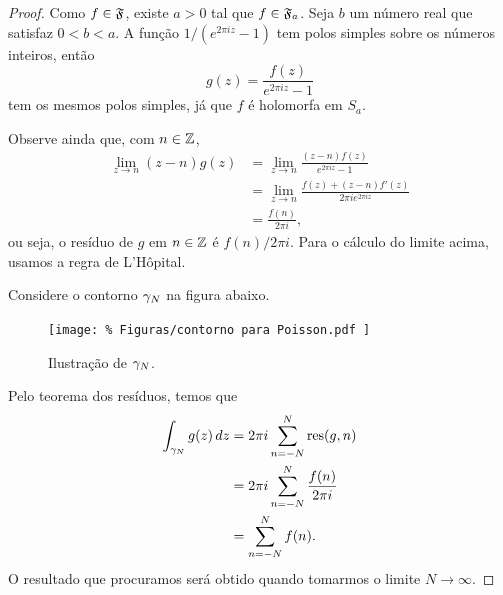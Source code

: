         \begin{proof}
            Como $f\in\mathfrak{F}$, existe $a > 0$ tal que $f\in\mathfrak{F}_a$. Seja 
            $b$ um número real que satisfaz $0<b<a$. A função $1/(e^{2\pi i z} - 1)$ 
            tem polos simples sobre os números inteiros, então
            \begin{equation*}
                g(z) = \frac{f(z)}{e^{2\pi i z} - 1}
            \end{equation*}
            tem os mesmos polos simples, já que $f$ é holomorfa em $S_a$. 
            
            Observe ainda que, com $n \in \mathbb{Z}$,
            \begin{align*}
                \lim_{z \to n} (z-n)g(z) & = 
                \lim_{z \to n} \frac{(z-n)f(z)}{e^{2\pi i z} - 1}\\
                &= \lim_{z \to n} \frac{f(z) + (z-n)f'(z)}{2\pi ie^{2\pi i z}} \\
                &= \frac{f(n)}{2\pi i},
            \end{align*}
            ou seja, o resíduo de $g$ em $n \in \mathbb{Z}$ é $f(n)/2\pi i$. Para o cálculo do limite acima,
            usamos a regra de L'Hôpital.
            
            Considere o contorno $\gamma_N$ na figura abaixo. 
            \begin{figure}[H]\centering
                \texttt{[image: \%
                    Figuras/contorno para Poisson.pdf
                ]}
                \caption{%
                    Ilustração de $\gamma_N$.
                }
            \end{figure}
            Pelo teorema dos resíduos, temos que 
            \begin{align*}
                \int_{\gamma_N}g(z)\,dz &= 2\pi i\sum_{n=-N}^{N}\operatorname{res}(g,n)\\
                &= 2 \pi i\sum_{n=-N}^{N}\frac{f(n)}{2 \pi i}\\
                &= \sum_{n=-N}^{N}f(n).
            \end{align*}
            O resultado que procuramos será obtido quando tomarmos o limite $N \to \infty$. 
            

\end{proof}
